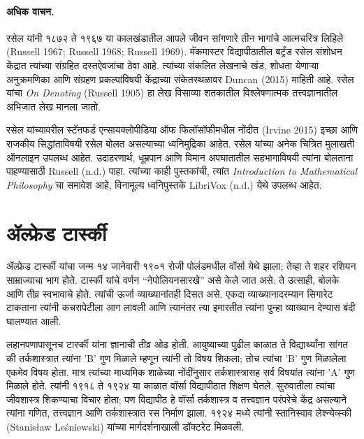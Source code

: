 \paragraph{अधिक वाचन.}
रसेल यांनी १८७२ ते १९६७ या कालखंडातील आपले जीवन सांगणारे तीन भागांचे आत्मचरित्र लिहिले (Russell 1967; Russell 1968; Russell 1969). मॅकमास्टर विद्यापीठातील बर्ट्रंड रसेल संशोधन केंद्रात त्यांच्या संग्रहित दस्तऐवजांचा ठेवा आहे. त्यांच्या संकलित लेखनाचे खंड, शोधता येणाऱ्या अनुक्रमणिका आणि संग्रहण प्रकल्पांविषयी केंद्राच्या संकेतस्थळावर Duncan (2015) माहिती आहे. रसेल यांचा \emph{On
  Denoting} (Russell 1905) हा लेख विसाव्या शतकातील विश्लेषणात्मक तत्त्वज्ञानातील अभिजात लेख मानला जातो.

रसेल यांच्यावरील स्टॅनफर्ड एन्सायक्लोपीडिया ऑफ फिलॉसॉफीमधील नोंदीत (Irvine 2015) इच्छा आणि राजकीय सिद्धांताविषयी रसेल बोलत असल्याच्या ध्वनिमुद्रिका आहेत. रसेल यांच्या अनेक चित्रित मुलाखती ऑनलाइन उपलब्ध आहेत. उदाहरणार्थ, धूम्रपान आणि विमान अपघातातील सहभागाविषयी त्यांना बोलताना पाहण्यासाठी Russell (n.d.) पाहा. त्यांच्या काही पुस्तकांची, त्यांत \emph{Introduction to Mathematical Philosophy} चा समावेश आहे, विनामूल्य ध्वनिपुस्तके LibriVox (n.d.) येथे उपलब्ध आहेत.













\section{ॲल्फ्रेड टार्स्की}\label{his:bio:tar:sec}



ॲल्फ्रेड टार्स्की यांचा जन्म १४ जानेवारी १९०१ रोजी पोलंडमधील वॉर्सा येथे झाला; तेव्हा ते शहर रशियन साम्राज्याचा भाग होते. टार्स्की यांचे वर्णन “नेपोलियनसारखे” असे केले जात असे: ते उत्साही, बोलके आणि तीव्र स्वभावाचे होते. त्यांची ऊर्जा व्याख्यानांतही दिसत असे. एकदा व्याख्यानादरम्यान सिगारेट टाकताना त्यांनी कचरापेटीला आग लावली आणि त्यानंतर त्या इमारतीत त्यांना पुन्हा व्याख्यान देण्यास बंदी घालण्यात आली.

लहानपणापासूनच टार्स्की यांना ज्ञानाची तीव्र ओढ होती. आयुष्याच्या पुढील काळात ते विद्यार्थ्यांना सांगत की तर्कशास्त्रात त्यांना 'B' गुण मिळाले म्हणून त्यांनी तो विषय शिकला; तोच त्यांचा 'B' गुण मिळालेला एकमेव विषय होता. मात्र त्यांच्या माध्यमिक शाळेच्या नोंदींनुसार तर्कशास्त्रासह सर्व विषयांत त्यांना 'A' गुण मिळाले होते. त्यांनी १९१८ ते १९२४ या काळात वॉर्सा विद्यापीठात शिक्षण घेतले. सुरुवातीला त्यांचा जीवशास्त्र शिकण्याचा विचार होता; पण विद्यापीठ हे वॉर्सा तर्कशास्त्र व तत्त्वज्ञान परंपरेचे केंद्र असल्याने त्यांना गणित, तत्त्वज्ञान आणि तर्कशास्त्रात रस निर्माण झाला. १९२४ मध्ये त्यांनी स्तानिस्वाव लेश्न्येव्स्की (Stanis\l{}aw Le\'{s}niewski) यांच्या मार्गदर्शनाखाली डॉक्टरेट मिळवली.

